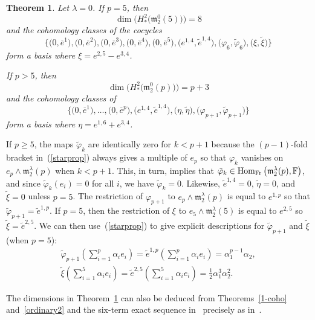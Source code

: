 \documentclass[10pt,a4paper]{amsart}
\def\Hom{\operatorname{Hom}}
\def\phi{\varphi}
\def\m{\mathfrak m}
\def\F{\mathbb F}
\numberwithin{equation}{section}
\newtheorem{Theorem}{Theorem}[section]
\begin{document}
\begin{Theorem}\label{zerolambda} Let $\lambda=0$.
 If $p=5$, then
 \[\dim\big(H_*^2\big(\m_2^0(5)\big)\big)=8\] and the
 cohomology classes of the cocycles
 \[\big\{\big(0,\overline e^1\big),\big(0,\overline e^2\big),\big(0,\overline e^3\big),
 \big(0,\overline e^4\big), \big(0,\overline e^5\big), \big(e^{1,4},\tilde e^{1,4}\big),
 \big(\phi_6, \tilde \phi_6\big), \big(\xi, \tilde \xi\big)\big\}\] form a basis where
 $\xi=e^{2,5}-e^{3,4}$.

 If $p>5$, then
 \[\dim\big(H^2_*\big(\m_2^0(p)\big)\big)=p+3\] and the cohomology
 classes of
 \[\big\{\big(0,\overline e^1\big),\dots, \big(0,\overline e^p\big),\big( e^{1,4},\tilde
 e^{1,4}\big),\big(\eta,\tilde \eta\big),\big(\phi_{p+1},\tilde \phi_{p+1}\big)\big\}\]
 form a basis where $\eta=e^{1,6}+e^{3,4}$.
\end{Theorem}


\begin{Remark}\label{mostarezero} If $p\ge 5$, the maps $\tilde\phi_k$ are
 identically zero for $k<p+1$ because the $(p-1)$-fold bracket in~(\ref{starprop}) always gives a multiple of $e_p$ so that $\phi_k$
 vanishes on $e_p\wedge \m_2^\lambda(p)$ when $k<p+1$. This, in turn,
 implies that $\tilde\phi_k\in\Hom_{\rm Fr}\big(\m_2^\lambda(p),\F\big)$, and
 since $\tilde\phi_k(e_i)=0$ for all $i$, we have
 $\tilde\phi_k=0$. Likewise, $\tilde e^{1,4}=0$, $\tilde\eta=0$, and
 $\tilde\xi=0$ unless $p=5$. The restriction of $\phi_{p+1}$ to
 $e_p\wedge \m_2^\lambda(p)$ is equal to $e^{1,p}$ so that
 $\tilde\phi_{p+1}=\tilde e^{1,p}$. If $p=5$, then the restriction of
 $\xi$ to $e_5\wedge \m_2^\lambda(5)$ is equal to $e^{2,5}$ so
 $\tilde\xi=\tilde e^{2,5}$. We can then use~(\ref{starprop}) to give
 explicit descriptions for $\tilde\phi_{p+1}$ and $\tilde\xi$ (when $p=5$):
 \begin{gather*}
 \tilde\phi_{p+1}\left (\sum_{i=1}^p \alpha_ie_i\right )=\tilde
 e^{1,p}\left (\sum_{i=1}^p \alpha_ie_i\right
 ) =\alpha_1^{p-1}\alpha_2,\nonumber\\
 \tilde\xi\left (\sum_{i=1}^5 \alpha_ie_i\right )=\tilde
 e^{2,5}\left (\sum_{i=1}^5 \alpha_ie_i\right
 ) =\frac{1}{2}\alpha_1^{3}\alpha_2^2.%
 \end{gather*}
\end{Remark}

\begin{Remark} The dimensions in Theorem~\ref{zerolambda} can also be deduced from Theorems~\ref{1-coho} and~\ref{ordinary2} and the six-term exact sequence in~\cite{Hochschild1954} precisely as in~\cite[Remark~4]{EvFi2019}.
\end{Remark}
\end{document}
